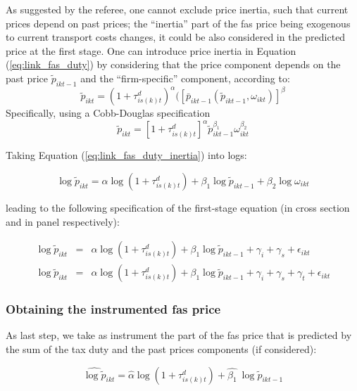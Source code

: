 \documentclass[11pt,twoside, authoryear]{elsarticle}
\begin{document}
As suggested by the referee, one cannot exclude price inertia, such that current prices depend on past prices; the ``inertia'' part of the fas price being exogenous to current transport costs changes, it could be also considered in the predicted price at the first stage. One can introduce price inertia in Equation (\ref{eq:link_fas_duty}) by considering that the price component depends on the past price $\widetilde{p}_{ikt-1}$ and the ``firm-specific'' component, according to:
$$\widetilde{p}_{ikt} = (1+\tau^d_{is(k)t})^\alpha (\left[\bar{p}_{ikt-1}(\widetilde{p}_{ikt-1}, \omega_{ikt})\right]^\beta $$
Specifically, using a Cobb-Douglas specification
\begin{equation}
\widetilde{p}_{ikt} = \left[1+\tau^d_{is(k)t}\right]^\alpha \widetilde{p}^{\beta_1}_{ikt-1}\omega_{ikt}^{\beta_2} \label{eq:link_fas_duty_inertia}
\end{equation}

Taking Equation (\ref{eq:link_fas_duty_inertia}) into logs:

$$\log \widetilde{p}_{ikt} = \alpha \log\left(1+\tau^d_{is(k)t}\right) + \beta_1 \log \widetilde{p}_{ikt-1}+ \beta_2\log \omega_{ikt}$$

leading to the following specification of the first-stage equation (in cross section and in panel respectively):

\begin{eqnarray}
\log \widetilde{p}_{ikt} &=& \alpha \log\left(1+\tau^d_{is(k)t}\right) + \beta_1 \log \widetilde{p}_{ikt-1}+ \gamma_i +\gamma_s +\epsilon_{ikt} \label{eq:FS_loglevel_cross_section_inertia}   \\
\log \widetilde{p}_{ikt} &=& \alpha \log\left(1+\tau^d_{is(k)t}\right) + \beta_1 \log \widetilde{p}_{ikt-1}+ \gamma_i +\gamma_s + \gamma_t+ \epsilon_{ikt} \label{eq:FS_loglevel_cross_section_panel}
\end{eqnarray}


\subsubsection{Obtaining the instrumented fas price}

As last step, we take as instrument the part of the fas price that is predicted by the sum of the tax duty and the past prices components (if considered):

$$\widehat{\log \widetilde{p}}_{ikt} = \widehat{ \alpha} \log\left(1+\tau^d_{is(k)t}\right) +  \widehat{\beta_1}\ \log \widetilde{p}_{ikt-1} $$
\end{document}
